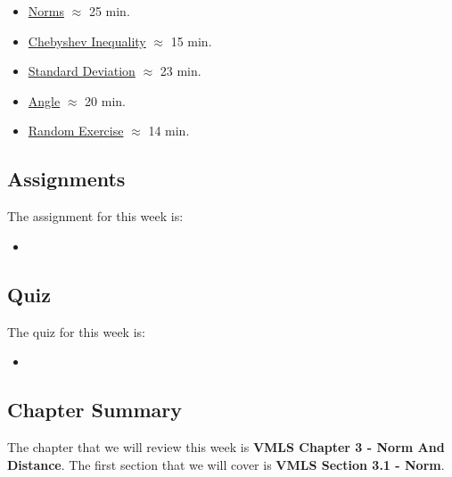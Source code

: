 \begin{itemize}
    \item \href{https://applied.cs.colorado.edu/mod/hvp/view.php?id=50692}{Norms} $\approx$ 25 min.
    \item \href{https://applied.cs.colorado.edu/mod/hvp/view.php?id=50693}{Chebyshev Inequality} $\approx$ 15 min.
    \item \href{https://applied.cs.colorado.edu/mod/hvp/view.php?id=50694}{Standard Deviation} $\approx$ 23 min.
    \item \href{https://applied.cs.colorado.edu/mod/hvp/view.php?id=50695}{Angle} $\approx$ 20 min.
    \item \href{https://applied.cs.colorado.edu/mod/hvp/view.php?id=50696}{Random Exercise} $\approx$ 14 min.
\end{itemize}

\subsection{Assignments}

The assignment for this week is:

\begin{itemize}
    \item {}
\end{itemize}

\subsection{Quiz}

The quiz for this week is:

\begin{itemize}
    \item {}
\end{itemize}

\newpage

\subsection{Chapter Summary}

The chapter that we will review this week is \textbf{VMLS Chapter 3 - Norm And Distance}. The first section that we will cover is \textbf{VMLS Section 3.1 - Norm}.

